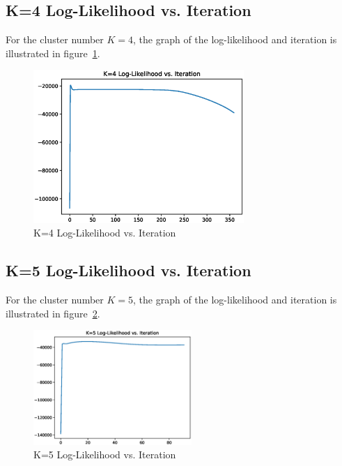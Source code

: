 \documentclass[11pt, a4paper]{article}
\begin{document}
\subsection{K=4 Log-Likelihood vs. Iteration}

For the cluster number $K=4$, the graph of the log-likelihood and iteration is illustrated in figure~\ref{fig:kf11}.

\begin{figure}[htbp]
	
	\centering 
	\includegraphics[width=8cm]{6_4.eps}
	
	\caption{K=4 Log-Likelihood vs. Iteration}
	\label{fig:kf11}
	
\end{figure}

\subsection{K=5 Log-Likelihood vs. Iteration}

For the cluster number $K=5$, the graph of the log-likelihood and iteration is illustrated in figure~\ref{fig:kf12}.

\begin{figure}[htbp]
	
	\centering 
	\includegraphics[width=6cm]{6_5.eps}
	
	\caption{K=5 Log-Likelihood vs. Iteration}
	\label{fig:kf12}
	
\end{figure}
\end{document}
